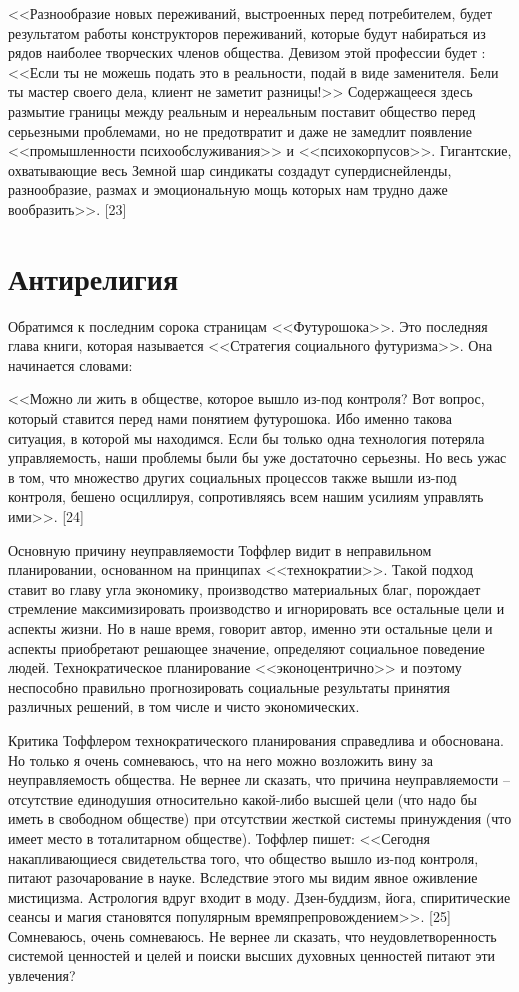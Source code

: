 \documentclass{book}
\begin{document}
<<Разнообразие новых переживаний, выстроенных перед по­требителем, будет результатом работы конструкторов пережи­ваний, которые будут набираться из рядов наиболее творче­ских членов общества. Девизом этой профессии будет : <<Если ты не можешь подать это в реальности, подай в виде заменителя. Бели ты мастер своего дела, клиент не заметит разницы!>> Содер­жащееся здесь размытие границы между реальным и нереаль­ным поставит общество перед серьезными проблемами, но не предотвратит и даже не замедлит появление <<промышленности психообслуживания>> и <<психокорпусов>>. Гигантские, охваты­вающие весь Земной шар синдикаты создадут супердиснейленды, разнообразие, размах и эмоциональную мощь которых нам трудно даже вообразить>>. [23]


\section{Антирелигия}

Обратимся к последним сорока страницам <<Футурошока>>. Это последняя глава книги, которая называется <<Стратегия со­циального футуризма>>. Она начинается словами:

<<Можно ли жить в обществе, которое вышло из-под конт­роля? Вот вопрос, который ставится перед нами понятием футурошока. Ибо именно такова ситуация, в которой мы находим­ся. Если бы только одна технология потеряла управляемость, наши проблемы были бы уже достаточно серьезны. Но весь ужас в том, что множество других социальных процессов также вышли из-под контроля, бешено осциллируя, сопротивляясь всем нашим усилиям управлять ими>>. [24]

Основную причину неуправляемости Тоффлер видит в непра­вильном планировании, основанном на принципах <<технократии>>. Такой подход ставит во главу угла экономику, произ­водство материальных благ, порождает стремление максимизи­ровать производство и игнорировать все остальные цели и ас­пекты жизни. Но в наше время, говорит автор, именно эти остальные цели и аспекты приобретают решающее значение, опре­деляют социальное поведение людей. Технократическое плани­рование <<эконоцентрично>> и поэтому неспособно правильно прогнозировать социальные результаты принятия различных ре­шений, в том числе и чисто экономических.

Критика Тоффлером технократического планирования спра­ведлива и обоснована. Но только я очень сомневаюсь, что на не­го можно возложить вину за неуправляемость общества. Не вер­нее ли сказать, что причина неуправляемости -- отсутствие еди­нодушия относительно какой-либо высшей цели (что надо бы иметь в свободном обществе) при отсутствии жесткой систе­мы принуждения (что имеет место в тоталитарном обществе). Тоффлер пишет: <<Сегодня накапливающиеся свидетельства того, что общество вышло из-под контроля, питают разочаро­вание в науке. Вследствие этого мы видим явное оживление мистицизма. Астрология вдруг входит в моду. Дзен-буддизм, йога, спиритические сеансы и магия становятся популярным времяпрепровождением>>. [25] Сомневаюсь, очень сомневаюсь. Не вернее ли сказать, что неудовлетворенность системой ценно­стей и целей и поиски высших духовных ценностей питают эти увлечения?
\end{document}
